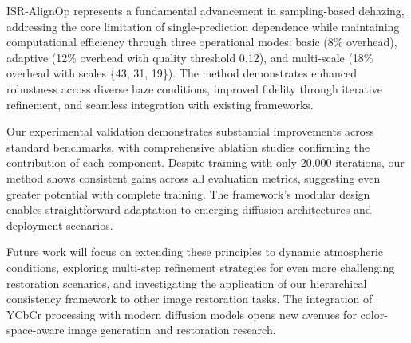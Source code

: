 \documentclass{article}
\begin{document}
ISR-AlignOp represents a fundamental advancement in sampling-based dehazing, addressing the core limitation of single-prediction dependence while maintaining computational efficiency through three operational modes: basic (8\% overhead), adaptive (12\% overhead with quality threshold 0.12), and multi-scale (18\% overhead with scales \{43, 31, 19\}). The method demonstrates enhanced robustness across diverse haze conditions, improved fidelity through iterative refinement, and seamless integration with existing frameworks.

Our experimental validation demonstrates substantial improvements across standard benchmarks, with comprehensive ablation studies confirming the contribution of each component. Despite training with only 20,000 iterations, our method shows consistent gains across all evaluation metrics, suggesting even greater potential with complete training. The framework's modular design enables straightforward adaptation to emerging diffusion architectures and deployment scenarios.

Future work will focus on extending these principles to dynamic atmospheric conditions, exploring multi-step refinement strategies for even more challenging restoration scenarios, and investigating the application of our hierarchical consistency framework to other image restoration tasks. The integration of YCbCr processing with modern diffusion models opens new avenues for color-space-aware image generation and restoration research.



\end{document}
